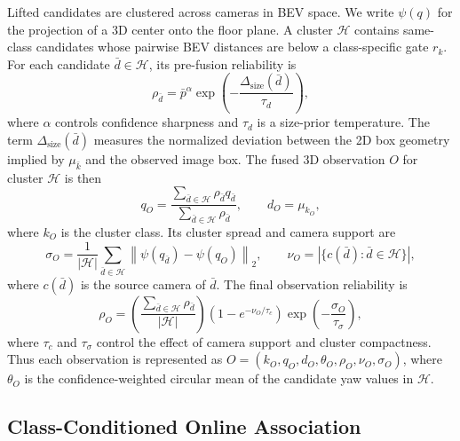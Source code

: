 \documentclass[runningheads]{llncs}
\begin{document}
Lifted candidates are clustered across cameras in BEV space. We write $\psi(q)$
for the projection of a 3D center onto the floor plane. A cluster $\mathcal{H}$
contains same-class candidates whose pairwise BEV distances are below a
class-specific gate $r_k$. For each candidate $\bar{d}\in\mathcal{H}$, its
pre-fusion reliability is
\begin{equation}
    \rho_{\bar{d}}
    =
    \bar{p}^{\alpha}
    \exp\!\left(-\frac{\Delta_{\mathrm{size}}(\bar{d})}{\tau_d}\right),
    \label{eq:candidate_reliability}
\end{equation}
where $\alpha$ controls confidence sharpness and $\tau_d$ is a size-prior
temperature. The term $\Delta_{\mathrm{size}}(\bar{d})$ measures the normalized
deviation between the 2D box geometry implied by $\mu_{\bar{k}}$ and the observed
image box. The fused 3D observation $O$ for cluster $\mathcal{H}$ is then
\begin{equation}
    q_O
    =
    \frac{\sum_{\bar{d}\in\mathcal{H}}\rho_{\bar{d}} q_{\bar{d}}}
         {\sum_{\bar{d}\in\mathcal{H}}\rho_{\bar{d}}},
    \qquad
    d_O=\mu_{k_O},
    \label{eq:multi_view_center}
\end{equation}
where $k_O$ is the cluster class. Its cluster spread and camera support are
\begin{equation}
    \sigma_O
    =
    \frac{1}{|\mathcal{H}|}
    \sum_{\bar{d}\in\mathcal{H}}
    \left\|\psi(q_{\bar{d}})-\psi(q_O)\right\|_2,
    \qquad
    \nu_O
    =
    \left|\{c(\bar{d}):\bar{d}\in\mathcal{H}\}\right|,
    \label{eq:spread_support}
\end{equation}
where $c(\bar{d})$ is the source camera of $\bar{d}$. The final observation
reliability is
\begin{equation}
    \rho_O
    =
    \left(\frac{\sum_{\bar{d}\in\mathcal{H}}\rho_{\bar{d}}}{|\mathcal{H}|}\right)
    \left(1-e^{-\nu_O/\tau_c}\right)
    \exp\!\left(-\frac{\sigma_O}{\tau_{\sigma}}\right),
    \label{eq:observation_reliability}
\end{equation}
where $\tau_c$ and $\tau_{\sigma}$ control the effect of camera support and cluster
compactness. Thus each observation is represented as
$O=(k_O,q_O,d_O,\theta_O,\rho_O,\nu_O,\sigma_O)$, where $\theta_O$ is the
confidence-weighted circular mean of the candidate yaw values in $\mathcal{H}$.

\subsection{Class-Conditioned Online Association}
\label{sec:method_association}
\end{document}

